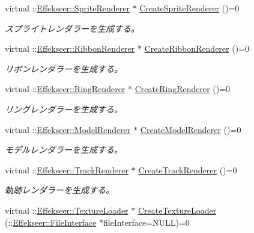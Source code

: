 \begin{DoxyCompactItemize}
virtual \+::\mbox{\hyperlink{class_effekseer_1_1_sprite_renderer}{Effekseer\+::\+Sprite\+Renderer}} $\ast$ \mbox{\hyperlink{class_effekseer_renderer_1_1_renderer_abecf62202fe3d54f4edf6c43d701188b}{Create\+Sprite\+Renderer}} ()=0
\begin{DoxyCompactList}\small\item\em スプライトレンダラーを生成する。 \end{DoxyCompactList}\item 
virtual \+::\mbox{\hyperlink{class_effekseer_1_1_ribbon_renderer}{Effekseer\+::\+Ribbon\+Renderer}} $\ast$ \mbox{\hyperlink{class_effekseer_renderer_1_1_renderer_ac65157c02f8936e054c2525e4722a4f7}{Create\+Ribbon\+Renderer}} ()=0
\begin{DoxyCompactList}\small\item\em リボンレンダラーを生成する。 \end{DoxyCompactList}\item 
virtual \+::\mbox{\hyperlink{class_effekseer_1_1_ring_renderer}{Effekseer\+::\+Ring\+Renderer}} $\ast$ \mbox{\hyperlink{class_effekseer_renderer_1_1_renderer_a84dec1c70cab5984ce151753b5c9bcb9}{Create\+Ring\+Renderer}} ()=0
\begin{DoxyCompactList}\small\item\em リングレンダラーを生成する。 \end{DoxyCompactList}\item 
virtual \+::\mbox{\hyperlink{class_effekseer_1_1_model_renderer}{Effekseer\+::\+Model\+Renderer}} $\ast$ \mbox{\hyperlink{class_effekseer_renderer_1_1_renderer_a7cbbeb73fa35b6cf356fcef7499301fb}{Create\+Model\+Renderer}} ()=0
\begin{DoxyCompactList}\small\item\em モデルレンダラーを生成する。 \end{DoxyCompactList}\item 
virtual \+::\mbox{\hyperlink{class_effekseer_1_1_track_renderer}{Effekseer\+::\+Track\+Renderer}} $\ast$ \mbox{\hyperlink{class_effekseer_renderer_1_1_renderer_a38cff31386fce6fe0122a4ac5804fd8f}{Create\+Track\+Renderer}} ()=0
\begin{DoxyCompactList}\small\item\em 軌跡レンダラーを生成する。 \end{DoxyCompactList}\item 
virtual \+::\mbox{\hyperlink{class_effekseer_1_1_texture_loader}{Effekseer\+::\+Texture\+Loader}} $\ast$ \mbox{\hyperlink{class_effekseer_renderer_1_1_renderer_a13e29065eaca81d5191d9bad1421c408}{Create\+Texture\+Loader}} (\+::\mbox{\hyperlink{class_effekseer_1_1_file_interface}{Effekseer\+::\+File\+Interface}} $\ast$file\+Interface=N\+U\+LL)=0

\end{DoxyCompactItemize}
